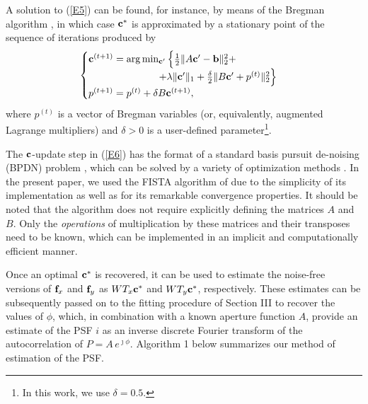 \pdfoutput=1 \documentclass[journal]{IEEEtran}
\newcommand{\ffx}{{\bf f}_x}
\newcommand{\ffy}{{\bf f}_y}
\newcommand{\cc}{{\bf c}}
\newcommand{\bb}{{\bf b}}
\begin{document}
A solution to (\ref{E5}) can be found, for instance, by means of the Bregman algorithm \cite{22}, in which case $\cc^\ast$ is approximated by a stationary point of the sequence of iterations produced by
\begin{equation} \label{E6}
\begin{cases}
\cc^{(t+1)} = \arg \min_{\cc^\prime} \Big\{ \frac{1}{2} \| A \cc^\prime - \bb \|_2^2  + \\
\hspace{2.5cm} + \lambda \| \cc^\prime \|_1 + \frac{\delta}{2} \| B \cc^\prime + p^{(t)} \|_2^2 \Big\} \\
p^{(t+1)} = p^{(t)} + \delta B \cc^{(t+1)},
\end{cases}
\end{equation}
where $p^{(t)}$ is a vector of Bregman variables (or, equivalently, augmented Lagrange multipliers) and $\delta > 0$ is a user-defined parameter\footnote{In this work, we use $\delta = 0.5$.}.

The $\cc$-update step in (\ref{E6}) has the format of a standard basis pursuit de-noising (BPDN) problem \cite{46}, which can be solved by a variety of optimization methods \cite{23}. In the present paper, we used the FISTA algorithm of \cite{33} due to the simplicity of its implementation as well as for its remarkable convergence properties. It should be noted that the algorithm does not require explicitly defining the matrices $A$ and $B$. Only the {\em operations} of multiplication by these matrices and their transposes need to be known, which can be implemented in an implicit and computationally efficient manner.

Once an optimal $\cc^\ast$ is recovered, it can be used to estimate the noise-free versions of $\ffx$ and $\ffy$ as $W T_x \cc^\ast$ and $W T_y \cc^\ast$, respectively. These estimates can be subsequently passed on to the fitting procedure of Section III to recover the values of $\phi$, which, in combination with a known aperture function $A$, provide an estimate of the PSF $i$ as an inverse discrete Fourier transform of the autocorrelation of $P = A \, e^{\jmath \phi}$. Algorithm 1 below summarizes our method of estimation of the PSF.
\end{document}
